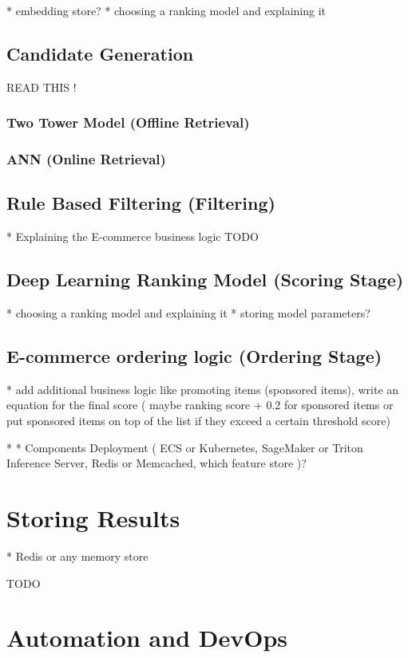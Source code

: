 * embedding store?
* choosing a ranking model and explaining it

\subsection{Candidate Generation}

\cite{NvidiaFeatureStores} READ THIS ! 

\subsubsection{Two Tower Model (Offline Retrieval)}

\subsubsection{ANN (Online Retrieval)}

\subsection{Rule Based Filtering (Filtering)}
* Explaining the E-commerce business logic
TODO 



\subsection{Deep Learning Ranking Model (Scoring Stage)}

* choosing a ranking model and explaining it
* storing model parameters?

\subsection{E-commerce ordering logic (Ordering Stage)}

* add additional business logic like promoting items (sponsored items), write an equation for the final score ( maybe ranking score + 0.2 for sponsored items or put sponsored items on top of the list if they exceed a certain threshold score)


* 
* Components Deployment ( ECS or Kubernetes, SageMaker or Triton Inference Server, Redis or Memcached, which feature store )?

\section{Storing Results}

* Redis or any memory store

TODO

\section{Automation and DevOps}
